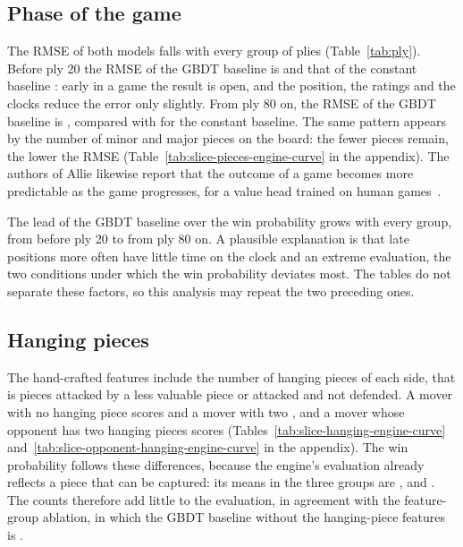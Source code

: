 \documentclass[11pt]{article}
\begin{document}
\subsection{Phase of the game}
\label{sec:phase}

The RMSE of both models falls with every group of plies
(Table~\ref{tab:ply}). Before ply 20 the RMSE of the GBDT baseline is
 and that of the constant baseline
: early in a game the result is open, and the
position, the ratings and the clocks reduce the error only slightly. From ply
80 on, the RMSE of the GBDT baseline is ,
compared with  for the constant baseline. The same
pattern appears by the number of minor and major pieces on the board: the
fewer pieces remain, the lower the RMSE
(Table~\ref{tab:slice-pieces-engine-curve} in the appendix). The authors of
Allie likewise report that the outcome of a game becomes more predictable as
the game progresses, for a value head trained on human
games~\cite{allie}.

\begin{table}[htbp]\centering\footnotesize
{}
\caption{Test-set results by ply. \emph{Baseline's lead} is the difference
between the two RMSE values, without a confidence interval.}
\label{tab:ply}
\end{table}

The lead of the GBDT baseline over the win probability grows with every
group, from  before ply 20 to
 from ply 80 on. A plausible explanation
is that late positions more often have little time on the clock and an
extreme evaluation, the two conditions under which the win probability
deviates most. The tables do not separate these factors, so this analysis may
repeat the two preceding ones.

\subsection{Hanging pieces}

The hand-crafted features include the number of hanging pieces of each side,
that is pieces attacked by a less valuable piece or attacked and not
defended. A mover with no hanging piece scores 
and a mover with two , and a mover whose opponent
has two hanging pieces scores 
(Tables~\ref{tab:slice-hanging-engine-curve}
and~\ref{tab:slice-opponent-hanging-engine-curve} in the appendix). The win
probability follows these differences, because the engine's evaluation
already reflects a piece that can be captured: its means in the three groups
are ,
 and
. The counts therefore add
little to the evaluation, in agreement with the feature-group ablation, in
which the GBDT baseline without the hanging-piece features is
.
\end{document}
